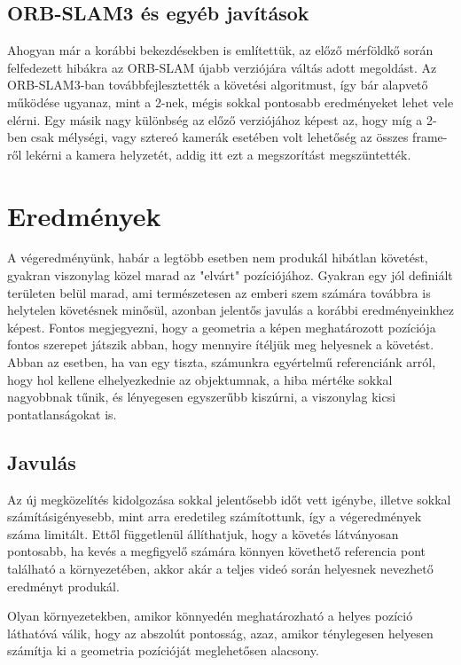 \subsection{ORB-SLAM3 és egyéb javítások}

Ahogyan már a korábbi bekezdésekben is említettük, az előző mérföldkő során felfedezett hibákra az ORB-SLAM újabb verziójára váltás adott megoldást.
Az ORB-SLAM3-ban továbbfejlesztették a követési algoritmust, így bár alapvető működése ugyanaz, mint a 2-nek, mégis sokkal pontosabb eredményeket lehet vele elérni.
Egy másik nagy különbség az előző verziójához képest az, hogy míg a 2-ben csak mélységi, vagy sztereó kamerák esetében volt lehetőség az összes frame-ről lekérni a kamera helyzetét, addig itt ezt a megszorítást megszüntették.


\section{Eredmények}

A végeredményünk, habár a legtöbb esetben nem produkál hibátlan követést, gyakran viszonylag közel marad az "elvárt" pozíciójához.
Gyakran egy jól definiált területen belül marad, ami természetesen az emberi szem számára továbbra is helytelen követésnek minősül, azonban jelentős javulás a korábbi eredményeinkhez képest.
Fontos megjegyezni, hogy a geometria a képen meghatározott pozíciója fontos szerepet játszik abban, hogy mennyire ítéljük meg helyesnek a követést.
Abban az esetben, ha van egy tiszta, számunkra egyértelmű referenciánk arról, hogy hol kellene elhelyezkednie az objektumnak, a hiba mértéke sokkal nagyobbnak tűnik, és lényegesen egyszerűbb kiszúrni, a viszonylag kicsi pontatlanságokat is.

\subsection{Javulás}

Az új megközelítés kidolgozása sokkal jelentősebb időt vett igénybe, illetve sokkal számításigényesebb, mint arra eredetileg számítottunk, így a végeredmények száma limitált.
Ettől függetlenül állíthatjuk, hogy a követés látványosan pontosabb, ha kevés a megfigyelő számára könnyen követhető referencia pont található a környezetében, akkor akár a teljes videó során helyesnek nevezhető eredményt produkál.

Olyan környezetekben, amikor könnyedén meghatározható a helyes pozíció láthatóvá válik, hogy az abszolút pontosság, azaz, amikor ténylegesen helyesen számítja ki a geometria pozícióját meglehetősen alacsony.

